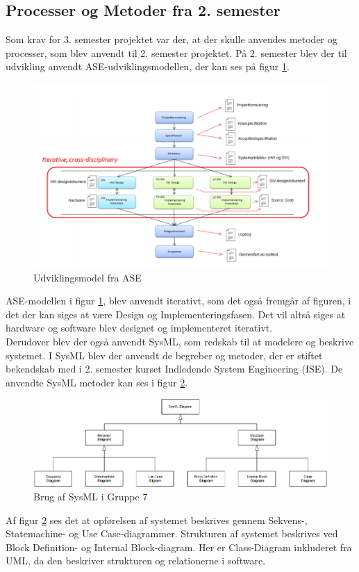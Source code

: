 \documentclass[Rapport/Rapport_main.tex]{subfiles}
\begin{document}
\subsection{Processer og Metoder fra 2. semester}
Som krav for 3. semester projektet var der, at der skulle anvendes metoder og processer, som blev anvendt til 2. semester projektet. På 2. semester blev der til udvikling anvendt ASE-udviklingsmodellen, der kan ses på figur \ref{fig:rap_ase_model}.
\begin{figure}[H]
    \centering
    \includegraphics[width=\textwidth]{Processdokument/graphics/ASE_model.png}
    \caption{Udviklingsmodel fra ASE}
    \label{fig:rap_ase_model}
\end{figure}
ASE-modellen i figur \ref{fig:rap_ase_model}, blev anvendt iterativt, som det også fremgår af figuren, i det der kan siges at være Design og Implementeringsfasen. Det vil altså siges at hardware og software blev designet og implementeret iterativt.\\
Derudover blev der også anvendt SysML, som redskab til at modelere og beskrive systemet. I SysML blev der anvendt de begreber og metoder, der er stiftet bekendskab med i 2. semester kurset Indledende System Engineering (ISE). De anvendte SysML metoder kan ses i figur \ref{fig:rap_sysml_usage}.
\begin{figure}[H]
    \centering
    \includegraphics[width=\textwidth]{Processdokument/graphics/Sysml_usage.png}
    \caption{Brug af SysML i Gruppe 7}
    \label{fig:rap_sysml_usage}
\end{figure}
Af figur \ref{fig:rap_sysml_usage} ses det at opførelsen af systemet beskrives gennem Sekvens-, Statemachine- og Use Case-diagrammer.
Strukturen af systemet beskrives ved Block Definition- og Internal Block-diagram. Her er Class-Diagram inkluderet fra UML, da den beskriver strukturen og relationerne i software.
\end{document}
